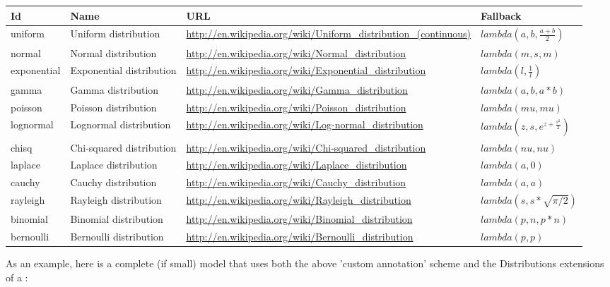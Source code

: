 \documentclass[draftspec]{sbmlpkgspec}
\newcommand{\distrib}{Distributions\xspace}
\begin{document}
\begin{blockChanged}
\begin{longtabu} to \linewidth {
    X[2,c]
    X[3,c]
    X[12,c]
    X[4,l]}
\textbf{Id} & \textbf{Name} & \textbf{URL} & \textbf{Fallback} \\ \midrule
uniform & Uniform distribution & \footnotesize{\url{http://en.wikipedia.org/wiki/Uniform_distribution_(continuous)}} &\small{$lambda(a,b,\frac{a+b}{2})$}
\\ \midrule
normal & Normal distribution & \footnotesize{\url{http://en.wikipedia.org/wiki/Normal_distribution}} &\small{$lambda(m,s,m)$}
\\ \midrule
exponential & Exponential distribution & \footnotesize{\url{http://en.wikipedia.org/wiki/Exponential_distribution}} &\small{$lambda(l,\frac{1}{l})$}
\\ \midrule
gamma & Gamma distribution & \footnotesize{\url{http://en.wikipedia.org/wiki/Gamma_distribution}} &\small{$lambda(a,b,a*b)$}
\\ \midrule
poisson & Poisson distribution & \footnotesize{\url{http://en.wikipedia.org/wiki/Poisson_distribution}} &\small{$lambda(mu,mu)$}
\\ \midrule
lognormal & Lognormal distribution & \footnotesize{\url{http://en.wikipedia.org/wiki/Log-normal_distribution}} &\small{$lambda(z,s,e^{z+\frac{s^2}{2}})$}
\\ \midrule
chisq & Chi-squared distribution & \footnotesize{\url{http://en.wikipedia.org/wiki/Chi-squared_distribution}} &\small{$lambda(nu,nu)$}
\\ \midrule
laplace & Laplace distribution & \footnotesize{\url{http://en.wikipedia.org/wiki/Laplace_distribution}} &\small{$lambda(a,0)$}
\\ \midrule
cauchy & Cauchy distribution & \footnotesize{\url{http://en.wikipedia.org/wiki/Cauchy_distribution}} &\small{$lambda(a,a)$}
\\ \midrule
rayleigh & Rayleigh distribution & \footnotesize{\url{http://en.wikipedia.org/wiki/Rayleigh_distribution}} &\small{$lambda(s,s*\sqrt{\pi/2})$}
\\ \midrule
binomial & Binomial distribution & \footnotesize{\url{http://en.wikipedia.org/wiki/Binomial_distribution}} &\small{$lambda(p,n,p*n)$}
\\ \midrule
bernoulli & Bernoulli distribution & \footnotesize{\url{http://en.wikipedia.org/wiki/Bernoulli_distribution}} &\small{$lambda(p,p)$}
\\
\bottomrule
\end{longtabu}

\clearpage
As an example, here is a complete (if small) model that uses both the above 'custom annotation' scheme and the \distrib extensions of a \FunctionDefinition:


\end{blockChanged}
\end{document}
